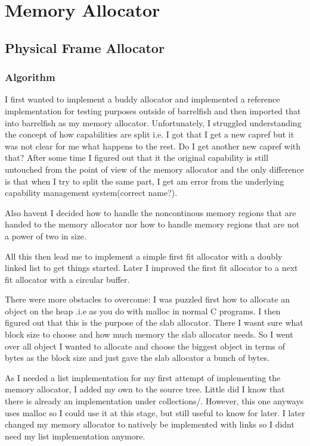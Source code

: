 \section{Memory Allocator}

\subsection{Physical Frame Allocator}

\subsubsection{Algorithm}

I first wanted to implement a buddy allocator and implemented a reference implementation for testing purposes outside of barrelfish and then imported that into barrelfish as my memory allocator. Unfortunately, I struggled understanding the concept of how capabilities are split i.e. I got that I get a new capref but it was not clear for me what happens to the rest. Do I get another new capref with that? After some time I figured out that it the original capability is still untouched from the point of view of the memory allocator and the only difference is that when I try to split the same part, I get am error from the underlying capability management system(correct name?).

Also havent I decided how to handle the noncontinous memory regions that are handed to the memory allocator nor how to handle memory regions that are not a power of two in size.

All this then lead me to implement a simple first fit allocator with a doubly linked list to get things started. Later I improved the first fit allocator to a next fit allocator with a circular buffer.

There were more obstacles to overcome: I was puzzled first how to allocate an object on the heap .i.e as you do with malloc in normal C programs. I then figured out that this is the purpose of the slab allocator. There I wasnt sure what block size to choose and how much memory the slab allocator needs. So I went over all object I wanted to allocate and choose the biggest object in terms of bytes as the block size and just gave the slab allocator a bunch of bytes.

As I needed a list implementation for my first attempt of implementing the memory allocator, I added my own to the source tree. Little did I know that there is already an implementation under collections/. However, this one anyways uses malloc so I could use it at this stage, but still useful to know for later. I later changed my memory allocator to natively be implemented with links so I didnt need my list implementation anymore.

